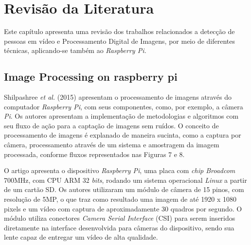 \documentclass[12pt,oneside,a4paper,chapter=TITLE,section=TITLE,sumario=tradicional]{abntex2}
\begin{document}
\begin{figure}[htb]
\end{figure}

\chapter{Revisão da Literatura}
\label{cap:revisao-literatura}

Este capítulo apresenta uma revisão dos trabalhos relacionados a detecção de pessoas em vídeo e Processamento Digital de Imagens, por meio de diferentes técnicas, aplicando-se também ao \textit{Raspberry Pi.}

\section{Image Processing on raspberry pi}
Shilpashree \textit{et al.} (2015) apresentam o processamento de imagens através do computador \textit{Raspberry Pi}, com seus componentes, como, por exemplo, a câmera \textit{Pi}. Os autores apresentam a implementação de metodologias e algoritmos com seu fluxo de ação para a captação de imagens sem ruídos. O conceito de processamento de imagens é explanado de maneira sucinta, como a captura por câmera, processamento através de um sistema e amostragem da imagem processada, conforme fluxos representados nas Figuras 7 e 8.

\begin{figure}[htb]
\end{figure}

\begin{figure}[htb]
\end{figure}

O artigo apresenta o dispositivo \textit{Raspberry Pi}, uma placa com \textit{chip Broadcom} 700MHz, com CPU ARM 32 \textit{bits}, rodando um sistema operacional \textit{Linux} a partir de um cartão SD. Os autores utilizaram um módulo de câmera de 15 pinos, com resolução de 5MP, o que traz como resultado uma imagem de até 1920 x 1080 pixels e um vídeo com captura de aproximadamente 30 quadros por segundo. O módulo utiliza conectores \textit{Camera Serial Interface} (CSI) para serem inseridos diretamente na interface desenvolvida para câmeras do dispositivo, sendo sua lente capaz de entregar um vídeo de alta qualidade.
\end{document}
